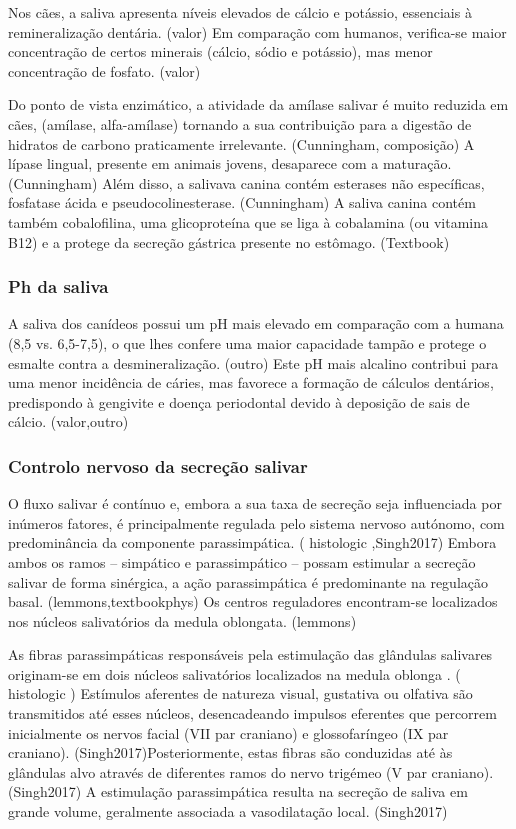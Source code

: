Nos cães, a saliva apresenta níveis elevados de cálcio e potássio, essenciais à remineralização dentária. (valor) Em comparação com humanos, verifica-se maior concentração de certos minerais (cálcio, sódio e potássio), mas menor concentração de fosfato. (valor)

Do ponto de vista enzimático, a atividade da amílase salivar é muito reduzida em cães, (amílase, alfa-amílase) tornando a sua contribuição para a digestão de hidratos de carbono praticamente irrelevante. (Cunningham, composição) A lípase lingual, presente em animais jovens, desaparece com a maturação. (Cunningham) Além disso, a salivava canina contém esterases não específicas, fosfatase ácida e pseudocolinesterase. (Cunningham) A saliva canina contém também cobalofilina, uma glicoproteína que se liga à cobalamina (ou vitamina B12) e a protege da secreção gástrica presente no estômago. (Textbook) 

\subsubsection{Ph da saliva}

A saliva dos canídeos possui um pH mais elevado em comparação com a humana (8,5 vs. 6,5-7,5), o que lhes confere uma maior capacidade tampão e protege o esmalte contra a desmineralização. (outro) Este pH mais alcalino contribui para uma menor incidência de cáries, mas favorece a formação de cálculos dentários, predispondo à gengivite e doença periodontal devido à deposição de sais de cálcio. (valor,outro)    

\subsubsection{Controlo nervoso da secreção salivar}

O fluxo salivar é contínuo e, embora a sua taxa de secreção seja influenciada por inúmeros fatores, é principalmente regulada pelo sistema nervoso autónomo, com predominância da componente parassimpática. (\cite{Poirier2018} histologic \cite{Bae2024},Singh2017) Embora ambos os ramos – simpático e parassimpático – possam estimular a secreção salivar de forma sinérgica, a ação parassimpática é predominante na regulação basal. (lemmons,textbookphys) 
Os centros reguladores encontram-se localizados nos núcleos salivatórios da medula oblongata. (lemmons)


As fibras parassimpáticas responsáveis pela estimulação das glândulas salivares originam-se em dois núcleos salivatórios localizados na medula oblonga . (\cite{Poirier2018} histologic \cite{Bae2024}) Estímulos aferentes de natureza visual, gustativa ou olfativa são transmitidos até esses núcleos, desencadeando impulsos eferentes que percorrem inicialmente os nervos facial (VII par craniano) e glossofaríngeo (IX par craniano). (Singh2017)Posteriormente, estas fibras são conduzidas até às glândulas alvo através de diferentes ramos do nervo trigémeo (V par craniano). (Singh2017) A estimulação parassimpática resulta na secreção de saliva em grande volume, geralmente associada a vasodilatação local. (Singh2017)


